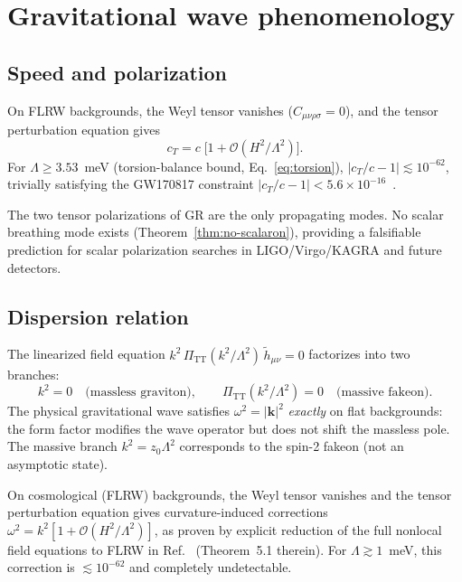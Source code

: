 \documentclass[12pt,a4paper]{article}
\newcommand{\Lam}{\Lambda}
\newcommand{\PiTT}{\Pi_{\mathrm{TT}}}
\begin{document}
\section{Gravitational wave phenomenology}
\label{sec:gw}

\subsection{Speed and polarization}

On FLRW backgrounds, the Weyl tensor vanishes ($C_{\mu\nu\rho\sigma} = 0$),
and the tensor perturbation equation gives~\cite{Alfyorov2025b}
\begin{equation}
  c_T = c\;\bigl[1 + \mathcal{O}(H^2/\Lam^2)\bigr].
\end{equation}
For $\Lam \geq 3.53$~meV (torsion-balance bound, Eq.~\ref{eq:torsion}),
$|c_T/c - 1| \lesssim 10^{-62}$, trivially satisfying the
GW170817 constraint $|c_T/c - 1| < 5.6 \times 10^{-16}$~\cite{GW170817}.

The two tensor polarizations of GR are the only propagating modes.
No scalar breathing mode exists (Theorem~\ref{thm:no-scalaron}),
providing a falsifiable prediction for scalar polarization searches
in LIGO/Virgo/KAGRA and future detectors.


\subsection{Dispersion relation}

The linearized field equation $k^2\,\PiTT(k^2/\Lam^2)\,\tilde{h}_{\mu\nu} = 0$
factorizes into two branches:
\begin{equation}\label{eq:branches}
  k^2 = 0 \quad \text{(massless graviton)}, \qquad
  \PiTT(k^2/\Lam^2) = 0 \quad \text{(massive fakeon)}.
\end{equation}
The physical gravitational wave satisfies $\omega^2 = |\mathbf{k}|^2$
\emph{exactly} on flat backgrounds: the form factor modifies the wave
operator but does not shift the massless pole. The massive branch
$k^2 = z_0\Lam^2$ corresponds to the spin-2 fakeon (not an asymptotic
state).

On cosmological (FLRW) backgrounds, the Weyl tensor vanishes and the
tensor perturbation equation gives curvature-induced corrections
$\omega^2 = k^2[1 + \mathcal{O}(H^2/\Lam^2)]$, as proven by
explicit reduction of the full nonlocal field equations to FLRW
in Ref.~\cite{Alfyorov2025b} (Theorem~5.1 therein). For
$\Lam \gtrsim 1$~meV, this correction is $\lesssim 10^{-62}$ and
completely undetectable.
\end{document}
